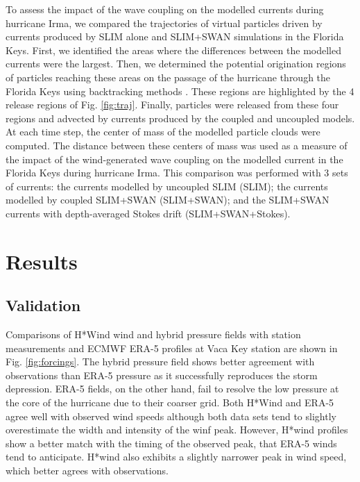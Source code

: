 \documentclass[11pt,a4paper]{article}
\begin{document}
To assess the impact of the wave coupling on the modelled currents during hurricane Irma, we compared the trajectories of virtual particles driven by currents produced by SLIM alone and SLIM+SWAN simulations in the Florida Keys. First, we identified the areas where the differences between the modelled currents were the largest. Then, we determined the potential origination regions of particles reaching these areas on the passage of the hurricane through the Florida Keys using backtracking methods \citep{dobbelaerereport}. These regions are highlighted by the 4 release regions of Fig. \ref{fig:traj}. Finally, particles were released from these four regions and advected by currents produced by the coupled and uncoupled models. At each time step, the center of mass of the modelled particle clouds were computed. The distance between these centers of mass was used as a measure of the impact of the wind-generated wave coupling on the modelled current in the Florida Keys during hurricane Irma. This comparison was performed with 3 sets of currents: the currents modelled by uncoupled SLIM (SLIM); the currents modelled by coupled SLIM+SWAN (SLIM+SWAN); and the SLIM+SWAN currents with depth-averaged Stokes drift (SLIM+SWAN+Stokes). 

\section{Results}

\subsection{Validation}

Comparisons of H*Wind wind and hybrid pressure fields with station measurements and ECMWF ERA-5 profiles at Vaca Key station are shown in Fig. \ref{fig:forcings}. The hybrid pressure field shows better agreement with observations than ERA-5 pressure as it successfully reproduces the storm depression. ERA-5 fields, on the other hand, fail to resolve the low pressure at the core of the hurricane due to their coarser grid. Both H*Wind and ERA-5 agree well with observed wind speeds although both data sets tend to slightly overestimate the width and intensity of the winf peak. However, H*wind profiles show a better match with the timing of the observed peak, that ERA-5 winds tend to anticipate. H*wind also exhibits a slightly narrower peak in wind speed, which better agrees with observations.
\end{document}
